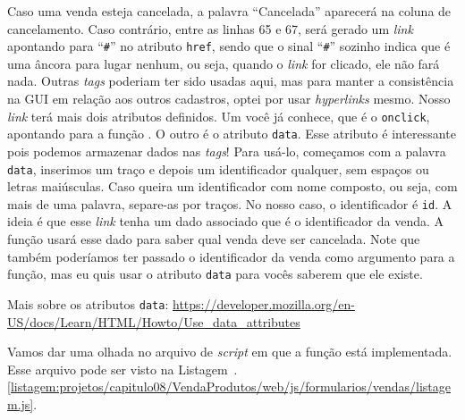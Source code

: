 
Caso uma venda esteja cancelada, a palavra ``Cancelada'' aparecerá na coluna de cancelamento. Caso contrário, entre as linhas 65 e 67, será gerado um \textit{link} apontando para ``\texttt{\#}'' no atributo \texttt{href}, sendo que o sinal ``\texttt{\#}'' sozinho indica que é uma âncora para lugar nenhum, ou seja, quando o \textit{link} for clicado, ele não fará nada. Outras \textit{tags} poderiam ter sido usadas aqui, mas para manter a consistência na GUI em relação aos outros cadastros, optei por usar \textit{hyperlinks} mesmo. Nosso \textit{link} terá mais dois atributos definidos. Um você já conhece, que é o \texttt{onclick}, apontando para a função . O outro é o atributo \texttt{data}. Esse atributo é interessante pois podemos armazenar dados nas \textit{tags}! Para usá-lo, começamos com a palavra \texttt{data}, inserimos um traço e depois um identificador qualquer, sem espaços ou letras maiúsculas. Caso queira um identificador com nome composto, ou seja, com mais de uma palavra, separe-as por traços. No nosso caso, o identificador é \texttt{id}. A ideia é que esse \textit{link} tenha um dado associado que é o identificador da venda. A função  usará esse dado para saber qual venda deve ser cancelada. Note que também poderíamos ter passado o identificador da venda como argumento para a função, mas eu quis usar o atributo \texttt{data} para vocês saberem que ele existe.

\begin{saibaMais}
    Mais sobre os atributos \texttt{data}: \url{https://developer.mozilla.org/en-US/docs/Learn/HTML/Howto/Use_data_attributes}
\end{saibaMais}

Vamos dar uma olhada no arquivo de \textit{script} em que a função  está implementada. Esse arquivo pode ser visto na Listagem~\thechapter.\ref{listagem:projetos/capitulo08/VendaProdutos/web/js/formularios/vendas/listagem.js}.


